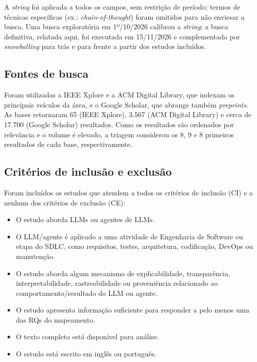 \documentclass[12pt]{article}
\begin{document}
A \textit{string} foi aplicada a todos os campos, sem restrição de período;
termos de técnicas específicas (ex.: \textit{chain-of-thought}) foram omitidos
para não enviesar a busca. Uma busca exploratória em 1º/10/2026 calibrou a
\textit{string}; a busca definitiva, relatada aqui, foi executada em 15/11/2026
e complementada por \textit{snowballing} para trás e para frente
\cite{wohlin2014} a partir dos estudos incluídos.

\subsection{Fontes de busca}

Foram utilizadas a IEEE Xplore e a ACM Digital Library, que indexam os
principais veículos da área, e o Google Scholar, que abrange também
\textit{preprints}. As bases retornaram 65 (IEEE Xplore), 3.567 (ACM Digital
Library) e cerca de 17.700 (Google Scholar) resultados. Como os resultados são
ordenados por relevância e o volume é elevado, a triagem considerou os 8, 9 e 8
primeiros resultados de cada base, respectivamente.

\subsection{Critérios de inclusão e exclusão}

Foram incluídos os estudos que atendem a todos os critérios de inclusão (CI) e a
nenhum dos critérios de exclusão (CE):

\begin{itemize}
  \item[CI1 --] O estudo aborda LLMs ou agentes de LLMs.
  \item[CI2 --] O LLM/agente é aplicado a uma atividade de Engenharia de
    Software ou etapa do SDLC, como requisitos, testes, arquitetura,
    codificação, DevOps ou manutenção.
  \item[CI3 --] O estudo aborda algum mecanismo de explicabilidade,
    transparência, interpretabilidade, rastreabilidade ou proveniência
    relacionado ao comportamento/resultado do LLM ou agente.
  \item[CI4 --] O estudo apresenta informação suficiente para responder a pelo
    menos uma das RQs do mapeamento.
  \item[CI5 --] O texto completo está disponível para análise.
  \item[CI6 --] O estudo está escrito em inglês ou português.
\end{itemize}
\end{document}
